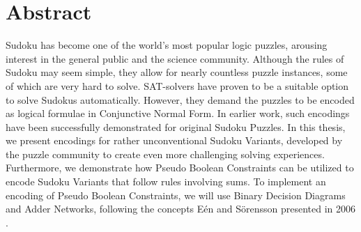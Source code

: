 \chapter{Abstract}
Sudoku has become one of the world's most popular logic puzzles, arousing interest in the general public and the science community. Although the rules of Sudoku may seem simple, they allow for nearly countless puzzle instances, some of which are very hard to solve. SAT-solvers have proven to be a suitable option to solve Sudokus automatically. However, they demand the puzzles to be encoded as logical formulae in Conjunctive Normal Form. In earlier work, such encodings have been successfully demonstrated for original Sudoku Puzzles. In this thesis, we present encodings for rather unconventional Sudoku Variants, developed by the puzzle community to create even more challenging solving experiences. Furthermore, we demonstrate how Pseudo Boolean Constraints can be utilized to encode Sudoku Variants that follow rules involving sums. To implement an encoding of Pseudo Boolean Constraints, we will use Binary Decision Diagrams and Adder Networks, following the concepts Eén and Sörensson presented in 2006 \cite{Een2006TranslatingPC}.
